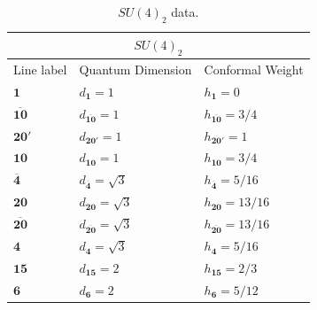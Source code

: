 \documentclass[11pt]{article}
\numberwithin{equation}{section}
\begin{document}
\begin{table}[t]
\centering
\begin{tabular}[h]{|p{4cm}|p{4cm}|p{4cm}| }
\hline 
\multicolumn{3}{|c|}{$SU(4)_{2}$} \\
\hline
Line label & Quantum Dimension & Conformal Weight \\
\hline
$\mathbf{1}$ & $d_{\mathbf{1}}=1$ & $h_{\mathbf{1}}=0$ \\
$\overline{\mathbf{10}}$ & $d_{\overline{\mathbf{10}}}=1$ & $h_{\overline{\mathbf{10}}}=3/4$ \\
$\mathbf{20}'$ & $d_{\mathbf{20}'}=1$ & $h_{\mathbf{20}'}=1$ \\
$\mathbf{10}$ & $d_{\mathbf{10}}=1$ & $h_{\mathbf{10}}=3/4$ \\
$\overline{\mathbf{4}}$ & $d_{\overline{\mathbf{4}}}=\sqrt{3} $ & $h_{\overline{\mathbf{4}}}=5/16$ \\
$\mathbf{20}$ & $d_{\mathbf{20}}=\sqrt{3}$ & $h_{\mathbf{20}}=13/16$ \\
$\overline{\mathbf{20}}$ & $d_{\overline{\mathbf{20}}}=\sqrt{3}$ & $h_{\overline{\mathbf{20}}}=13/16$ \\
$\mathbf{4}$ & $d_{\mathbf{4}}=\sqrt{3}$ & $h_{\mathbf{4}}=5/16$ \\
$\mathbf{15}$ & $d_{\mathbf{15}}=2$ & $h_{\mathbf{15}}=2/3$ \\
$\mathbf{6}$ & $d_{\mathbf{6}}=2$ & $h_{\mathbf{6}}=5/12$ \\
\hline
\end{tabular}
\caption{$SU(4)_{2}$ data.}  \label{su4lv2table}
\end{table}
\end{document}
